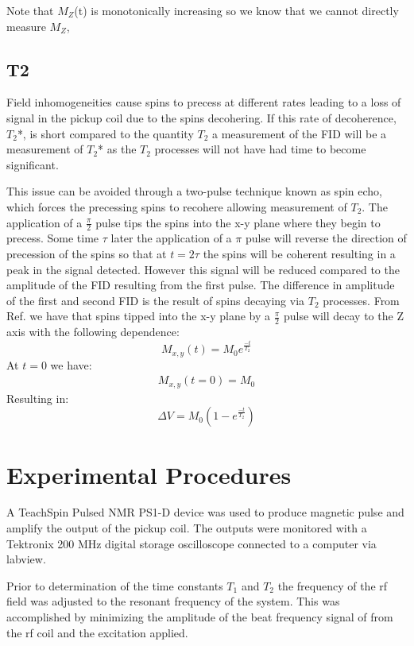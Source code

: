 \documentclass[11pt,letterpaper]{article}
\begin{document}
Note that $M_Z$(t) is monotonically increasing so we know that we cannot directly measure $M_Z$, 
\subsection{T2}
Field inhomogeneities cause spins to precess at different rates leading to a loss of signal in the pickup coil due to the spins decohering. If this rate of decoherence, $T_2$*,  is short compared to the quantity $T_2$ a measurement of the FID will be a measurement of $T_2$* as the $T_2$ processes will not have had time to become significant. 


This issue can be avoided through a two-pulse technique known as spin echo, which forces the precessing spins to recohere allowing measurement of $T_2$. The application of a $\frac{\pi}{2}$ pulse tips the spins into the x-y plane where they begin to precess. Some time $\tau$ later the application of a $\pi$ pulse will reverse the direction of precession of the spins so that at $t=2\tau$ the spins will be coherent resulting in a peak in the signal detected. However this signal will be reduced compared to the amplitude of the FID resulting from the first pulse. The difference in amplitude of the first and second FID is the result of spins decaying via $T_2$ processes. 
From Ref. \cite{TeachspinManual} we have that spins tipped into the x-y plane by a $\frac{\pi}{2}$ pulse will decay to the Z axis with the following dependence:
\begin{equation}
M_{x,y}(t)=M_0e^{\frac{-t}{T_2}}
\end{equation}
At $t=0$ we have:
\begin{align}
M_{x,y}(t=0)=M_0
\end{align}
Resulting in:
\begin{equation}
\label{eq:T2_Fit}
\Delta V=M_0(1-e^{\frac{-t}{T_2}})
\end{equation}

\section{Experimental Procedures}
A TeachSpin Pulsed NMR PS1-D device was used to produce magnetic pulse and amplify the output of the pickup coil. The outputs were monitored with a Tektronix 200 MHz digital storage oscilloscope connected to a computer via labview. 

Prior to determination of the time constants $T_1$ and $T_2$ the frequency of the rf field was adjusted to the resonant frequency of the system. This was accomplished by minimizing the amplitude of the beat frequency signal of from the rf coil and the excitation applied.
\end{document}
